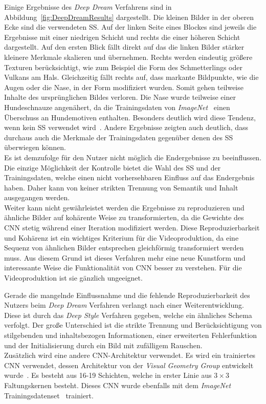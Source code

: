 \documentclass[times, 11pt,twocolumn]{article}
\begin{document}
Einige Ergebnisse des \textit{Deep Dream} Verfahrens sind in Abbildung~\ref{fig:DeepDreamResults} dargestellt. Die kleinen Bilder in der oberen Ecke sind die verwendeten SS. Auf der linken Seite eines Blockes sind jeweils die Ergebnisse mit einer niedrigen Schicht und rechts die einer höheren Schicht dargestellt. Auf den ersten Blick fällt direkt auf das die linken Bilder stärker kleinere Merkmale skalieren und übernehmen. Rechts werden eindeutig größere Texturen berücksichtigt, wie zum Beispiel die Form des Schmetterlings oder Vulkans am Hals. Gleichzeitig fällt rechts auf, dass markante Bildpunkte, wie die Augen oder die Nase, in der Form modifiziert wurden. Somit gehen teilweise Inhalte des ursprünglichen Bildes verloren. Die Nase wurde teilweise einer Hundeschnauze angenähert, da die Trainingsdaten von \textit{ImageNet}~\cite{ImageNet} einen Überschuss an Hundemotiven enthalten. Besonders deutlich wird diese Tendenz, wenn kein SS verwendet wird~\cite{McCaigDG16}. Andere Ergebnisse zeigten auch deutlich, dass durchaus auch die Merkmale der Trainingsdaten gegenüber denen des SS überwiegen können.
\\
Es ist demzufolge für den Nutzer nicht möglich die Endergebnisse zu beeinflussen. Die einzige Möglichkeit der Kontrolle bietet die Wahl des SS und der Trainingsdaten, welche einen nicht vorhersehbaren Einfluss auf das Endergebnis haben. Daher kann von keiner strikten Trennung von Semantik und Inhalt ausgegangen werden. \\
Weiter kann nicht gewährleistet werden die Ergebnisse zu reproduzieren und ähnliche Bilder auf kohärente Weise zu transformierten, da die Gewichte des CNN stetig während einer Iteration modifiziert werden. Diese Reproduzierbarkeit und Kohärenz ist ein wichtiges Kriterium für die Videoproduktion, da eine Sequenz von ähnlichen Bilder entsprechen gleichförmig transformiert werden muss. Aus diesem Grund ist dieses Verfahren mehr eine neue Kunstform und interessante Weise die Funktionalität von CNN besser zu verstehen. Für die Videoproduktion ist sie gänzlich ungeeignet.



\label{sec:DeepStyle}
Gerade die mangelnde Einflussnahme und die fehlende Reproduzierbarkeit des Nutzers beim \textit{Deep Dream} Verfahren \cite{DeepDream} verlangt nach einer Weiterentwicklung. Diese ist durch das \textit{Deep Style} Verfahren \cite{GatysEB15a} gegeben, welche ein ähnliches Schema verfolgt. Der große Unterschied ist die strikte Trennung und Berücksichtigung von stilgebenden und inhaltsbezogen Informationen, einer erweiterten Fehlerfunktion und der Initialisierung durch ein Bild mit zufälligem Rauschen.\\
Zusätzlich wird eine andere CNN-Architektur verwendet. Es wird ein trainiertes CNN verwendet, dessen Architektur von der \textit{Visual Geometry Group} entwickelt wurde~\cite{SimonyanZ14a}. Es besteht aus 16-19 Schichten, welche in erster Linie aus $3\times3$ Faltungskernen besteht. Dieses CNN wurde ebenfalls mit dem \textit{ImageNet} Trainingsdatenset~\cite{ImageNet} trainiert.
\end{document}
